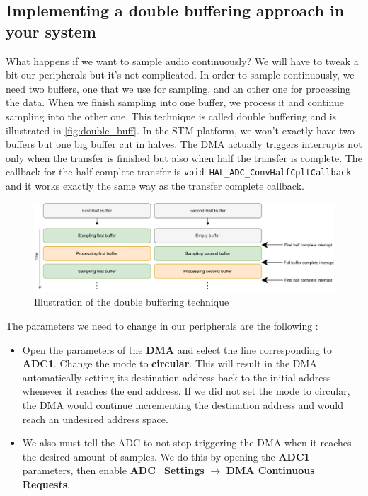 
\subsection{Implementing a double buffering approach in your system}
What happens if we want to sample audio continuously? We will have to tweak a bit our peripherals but it's not complicated. In order to sample continuously, we need two buffers, one that we use for sampling, and an other one for processing the data. When we finish sampling into one buffer, we process it and continue sampling into the other one. This technique is called double buffering and is illustrated in \autoref{fig:double_buff}. In the STM platform, we won't exactly have two buffers but one big buffer cut in halves. The DMA actually triggers interrupts not only when the transfer is finished but also when half the transfer is complete. The callback for the half complete transfer is \texttt{void HAL\_ADC\_ConvHalfCpltCallback} and it works exactly the same way as the transfer complete callback.\\

\begin{figure}[h]
    \centering
    \includegraphics[scale=0.8]{figures/double_buffering.pdf}
    \caption{Illustration of the double buffering technique}
    \label{fig:double_buff}
\end{figure}

\noindent The parameters we need to change in our peripherals are the following :
\begin{itemize}
    \item Open the parameters of the \textbf{DMA} and select the line corresponding to \textbf{ADC1}. Change the mode to \textbf{circular}. This will result in the DMA automatically setting its destination address back to the initial address whenever it reaches the end address. If we did not set the mode to circular, the DMA would continue incrementing the destination address and would reach an undesired address space.
    \item We also must tell the ADC to not stop triggering the DMA when it reaches the desired amount of samples. We do this by opening the \textbf{ADC1} parameters, then enable \textbf{ADC\_Settings} $\rightarrow$ \textbf{DMA Continuous Requests}.
\end{itemize}


